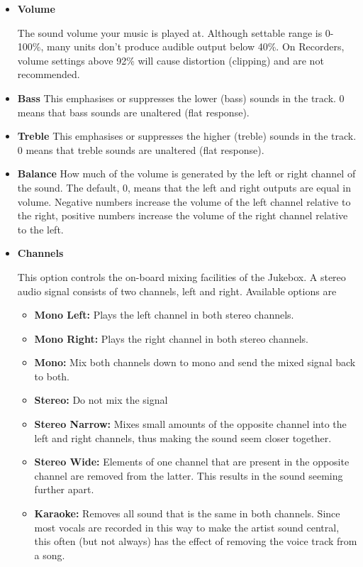 \begin{itemize}
\item \textbf{Volume}

The sound volume your music is played at. Although settable range is
0{}-100\%, many units don't produce audible output
below 40\%.  On Recorders, volume settings above 92\% will cause
distortion (clipping) and are not recommended.

\item \textbf{Bass}
This emphasises or suppresses the lower
(bass) sounds in the track.  0 means that bass sounds are unaltered
(flat response).

\item \textbf{Treble}
This emphasises or suppresses the higher
(treble) sounds in the track.  0 means that treble sounds are unaltered
(flat response).

\item \textbf{Balance}
How much of the volume is generated by the left or right channel of the
sound.  The default, 0, means that the left and right outputs are equal
in volume.  Negative numbers increase the volume of the left channel
relative to the right, positive numbers increase the volume of the
right channel relative to the left.

\item \textbf{Channels}

This option controls the on{}-board mixing
facilities of the Jukebox.  A stereo audio signal consists of two
channels, left and right.  Available options are

\begin{itemize}
\item \textbf{Mono Left: }Plays the left channel in both stereo channels.
\item \textbf{Mono Right:} Plays the right channel in both stereo channels.
\item \textbf{Mono:} Mix both channels down to mono and send the mixed signal
back to both.
\item \textbf{Stereo:} Do not mix the signal
\item \textbf{Stereo Narrow: }Mixes small amounts of the opposite channel into
the left and right channels, thus making the sound seem closer
together.
\item \textbf{Stereo Wide:} Elements of one channel that are present in the
opposite channel are removed from the latter.  This results in the
sound seeming further apart.
\item \textbf{Karaoke:} Removes all sound that is the same in both channels. 
Since most vocals are recorded in this way to make the artist sound
central, this often (but not always) has the effect of removing the
voice track from a song.
\end{itemize}


\end{itemize}
